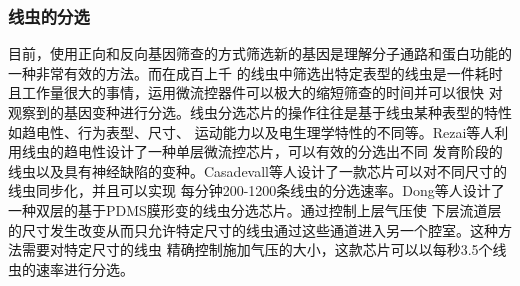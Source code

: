 \subsubsection{线虫的分选}
\label{sec:intro:analog}
	目前，使用正向和反向基因筛查的方式筛选新的基因是理解分子通路和蛋白功能的一种非常有效的方法。而在成百上千
	的线虫中筛选出特定表型的线虫是一件耗时且工作量很大的事情，运用微流控器件可以极大的缩短筛查的时间并可以很快
	对观察到的基因变种进行分选。线虫分选芯片的操作往往是基于线虫某种表型的特性如趋电性、行为表型、尺寸、
	运动能力以及电生理学特性的不同等。Rezai\cite{Rezai2012Electrical}等人利用线虫的趋电性设计了一种单层微流控芯片，可以有效的分选出不同
	发育阶段的线虫以及具有神经缺陷的变种。Casadevall\cite{Casadevall2011High}等人设计了一款芯片可以对不同尺寸的线虫同步化，并且可以实现
	每分钟200-1200条线虫的分选速率。Dong\cite{dong2016versatile}等人设计了一种双层的基于PDMS膜形变的线虫分选芯片。通过控制上层气压使
	下层流道层的尺寸发生改变从而只允许特定尺寸的线虫通过这些通道进入另一个腔室。这种方法需要对特定尺寸的线虫
	精确控制施加气压的大小，这款芯片可以以每秒3.5个线虫的速率进行分选。

